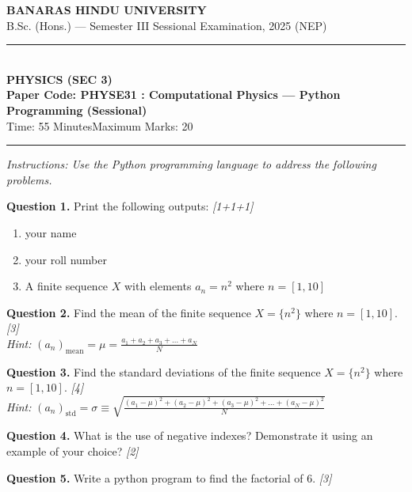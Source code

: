 \documentclass[11pt,a4paper]{article}
\newcommand{\pts}[1]{\hfill \textit{[#1]}}
\begin{document}
\begin{center}
  {\large\bfseries BANARAS HINDU UNIVERSITY}\\[2pt]
  {\normalsize B.Sc. (Hons.) --- Semester III Sessional Examination, 2025 (NEP)}\\[6pt]
  \rule{0.8\linewidth}{0.5pt}\\[6pt]
  {\large\bfseries PHYSICS (SEC 3)}\\[4pt]
  {\large\bfseries Paper Code: PHYSE31 : Computational Physics --- Python Programming (Sessional)}\\[4pt]
  {\normalsize Time: 55 Minutes\hfill Maximum Marks: 20}
\end{center}

\rule{\linewidth}{0.4pt}

\smallskip

\noindent \textit{Instructions: Use the Python programming language to address the following problems.}

\bigskip

\noindent \textbf{Question 1.} Print the following outputs: \pts{1+1+1}
\begin{enumerate}[label=\alph*)]
  \item your name
  \item your roll number
  \item A finite sequence $X$ with elements $a_n = n^2$ where $n = [1, 10]$
\end{enumerate}

\bigskip

\noindent \textbf{Question 2.} Find the mean of the finite sequence $X = \{n^2\}$ where $n = [1, 10]$. \pts{3}\\
\textit{Hint:} $(a_n)_{\text{mean}} = \mu = \frac{a_1 + a_2 + a_3 + \dots + a_N}{N}$

\bigskip

\noindent \textbf{Question 3.} Find the standard deviations of the finite sequence $X = \{n^2\}$ where $n = [1, 10]$. \pts{4}\\
\textit{Hint:} $(a_n)_{\text{std}} = \sigma \equiv \sqrt{\frac{(a_1 - \mu)^2 + (a_2 - \mu)^2 + (a_3 - \mu)^2 + \dots + (a_N - \mu)^2}{N}}$

\bigskip

\noindent \textbf{Question 4.} What is the use of negative indexes? Demonstrate it using an example of your choice? \pts{2}

\bigskip

\noindent \textbf{Question 5.} Write a python program to find the factorial of 6. \pts{3}
\end{document}
